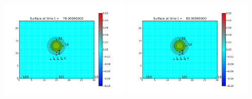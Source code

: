 \documentclass[11pt]{article}
\begin{document}
\vskip 10pt 
\includegraphics[width=0.475\textwidth]{frame0029fig0.png}
\vskip 10pt 
\includegraphics[width=0.475\textwidth]{frame0030fig0.png}
\end{document}
